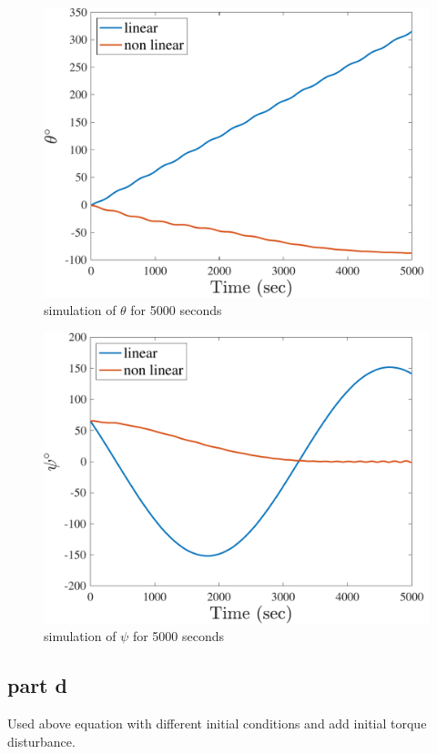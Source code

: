 \begin{figure}[H]
    \caption{simulation of $\theta$ for 5000 seconds}
    \centering
    \includegraphics[width=12cm]{../Figure/Q2/theta_5000}
\end{figure}

\begin{figure}[H]
    \caption{simulation of $\psi$ for 5000 seconds}
    \centering
    \includegraphics[width=12cm]{../Figure/Q2/psi_5000}
\end{figure}

\subsection{part d}

Used above equation with different initial conditions and add initial torque disturbance.

